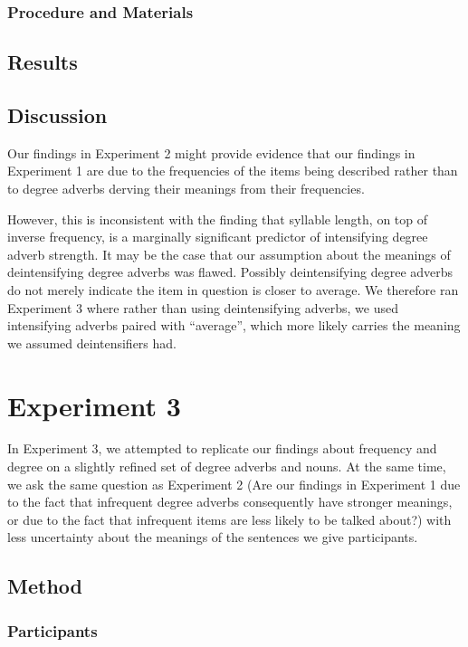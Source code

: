 \documentclass[10pt,letterpaper]{article}
\begin{document}
    \subsubsection{Procedure and Materials}
  \subsection{Results}
  \subsection{Discussion}
  
  Our findings in Experiment 2 might provide evidence that our findings in Experiment 1 are due to the frequencies of the items being described rather than to degree adverbs derving their meanings from their frequencies.
  
  However, this is inconsistent with the finding that syllable length, on top of inverse frequency, is a marginally significant predictor of intensifying degree adverb strength. It may be the case that our assumption about the meanings of deintensifying degree adverbs was flawed. Possibly deintensifying degree adverbs do not merely indicate the item in question is closer to average. We therefore ran Experiment 3 where rather than using deintensifying adverbs, we used intensifying adverbs paired with ``average'', which more likely carries the meaning we assumed deintensifiers had.
  
\section{Experiment 3}

  In Experiment 3, we attempted to replicate our findings about frequency and degree on a slightly refined set of degree adverbs and nouns. At the same time, we ask the same question as Experiment 2 (Are our findings in Experiment 1 due to the fact that infrequent degree adverbs consequently have stronger meanings, or due to the fact that infrequent items are less likely to be talked about?) with less uncertainty about the meanings of the sentences we give participants. 
  
  \subsection{Method}
    \subsubsection{Participants}
\end{document}
